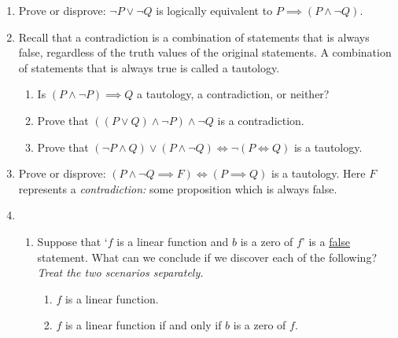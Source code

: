\begin{enumerate}
  \item Prove or disprove: $\neg P \lor \neg Q$ is logically equivalent to $P \implies (P \land \neg Q)$. 

  
  \item Recall that a contradiction is a combination of statements that is always false, regardless of the truth
values of the original statements. A combination of statements that is always true is called a tautology.
  \begin{enumerate}
    \item Is $(P\wedge \neg P ) \implies Q$ a tautology, a contradiction, or neither?
    \item Prove that $((P\vee Q)\wedge \neg P)\wedge\neg Q$ is a contradiction.
  	\item Prove that $(\neg P\wedge Q)\vee(P\wedge\neg Q)\iff\neg(P\iff Q)$ is a tautology.
  \end{enumerate}
  
  \item Prove or disprove: $(P\wedge \neg Q\implies F)\iff (P\implies Q)$ is a tautology. Here $F$ represents a \emph{contradiction:} some proposition which is always false.
		

  \item 
  \begin{enumerate}
  \item Suppose that `$f$ is a linear function and $b$ is a zero of $f$' is a \underline{false} statement. What can we conclude if we discover each of the following? \emph{Treat the two scenarios separately.}
		\begin{enumerate}
	  	\item $f$ is a linear function.
	  	\item $f$ is a linear function if and only if $b$ is a zero of $f$.
		\end{enumerate}
  

\end{enumerate}
\end{enumerate}
